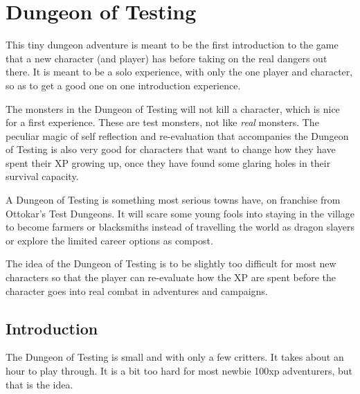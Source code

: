 
%





\section*{Dungeon of Testing}

This tiny dungeon adventure is meant to be the first introduction to the game that a new character (and player) has before taking on the real dangers out there. It is meant to be a solo experience, with only the one player and character, so as to get a good one on one introduction experience.

The monsters in the Dungeon of Testing will not kill a character, which is nice for a first experience. These are test monsters, not like \emph{real} monsters. The peculiar magic of self reflection and re-evaluation that accompanies the Dungeon of Testing is also very good for characters that want to change how they have spent their XP growing up, once they have found some glaring holes in their survival capacity.

A Dungeon of Testing is something most serious towns have, on franchise from Ottokar's Test Dungeons. It will scare some young fools into staying in the village to become farmers or blacksmiths instead of travelling the world as dragon slayers or explore the limited career options as compost.

The idea of the Dungeon of Testing is to be slightly too difficult for most new characters so that the player can re-evaluate how the XP are spent before the character goes into real combat in adventures and campaigns.




\subsection*{Introduction}

The Dungeon of Testing is small and with only a few critters. It takes about an hour to play through. It is a bit too hard for most newbie 100xp adventurers, but that is the idea.

